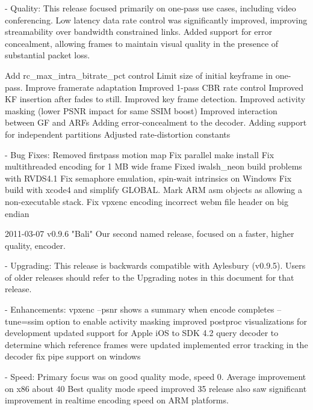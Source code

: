 \begin{DoxyVerbInclude}
  - Quality:
      This release focused primarily on one-pass use cases, including
      video conferencing. Low latency data rate control was significantly
      improved, improving streamability over bandwidth constrained links.
      Added support for error concealment, allowing frames to maintain
      visual quality in the presence of substantial packet loss.

          Add rc_max_intra_bitrate_pct control
          Limit size of initial keyframe in one-pass.
          Improve framerate adaptation
          Improved 1-pass CBR rate control
          Improved KF insertion after fades to still.
          Improved key frame detection.
          Improved activity masking (lower PSNR impact for same SSIM boost)
          Improved interaction between GF and ARFs
          Adding error-concealment to the decoder.
          Adding support for independent partitions
          Adjusted rate-distortion constants


  - Bug Fixes:
          Removed firstpass motion map
          Fix parallel make install
          Fix multithreaded encoding for 1 MB wide frame
          Fixed iwalsh_neon build problems with RVDS4.1
          Fix semaphore emulation, spin-wait intrinsics on Windows
          Fix build with xcode4 and simplify GLOBAL.
          Mark ARM asm objects as allowing a non-executable stack.
          Fix vpxenc encoding incorrect webm file header on big endian


2011-03-07 v0.9.6 "Bali"
  Our second named release, focused on a faster, higher quality, encoder.

  - Upgrading:
    This release is backwards compatible with Aylesbury (v0.9.5). Users
    of older releases should refer to the Upgrading notes in this
    document for that release.

  - Enhancements:
      vpxenc --psnr shows a summary when encode completes
      --tune=ssim option to enable activity masking
      improved postproc visualizations for development
      updated support for Apple iOS to SDK 4.2
      query decoder to determine which reference frames were updated
      implemented error tracking in the decoder
      fix pipe support on windows

  - Speed:
      Primary focus was on good quality mode, speed 0. Average improvement
      on x86 about 40%
      Best quality mode speed improved 35%
      release also saw significant improvement in realtime encoding speed
      on ARM platforms.


\end{DoxyVerbInclude}
